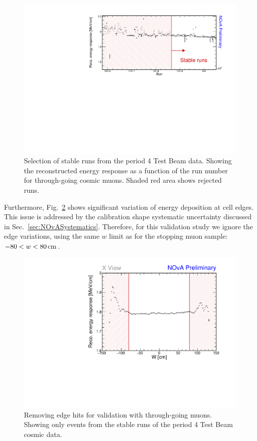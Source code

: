\begin{figure}[!ht]
  \centering
  \includegraphics[width=0.8\linewidth]{Plots/PCListAna/Period4StableRuns.pdf}
  \caption[Selection of stable runs from the period 4 Test Beam data]{Selection of stable runs from the period 4 Test Beam data. Showing the reconstructed energy response as a function of the run number for through-going cosmic muons. Shaded red area shows rejected runs.}
  \label{fig:ValidStableRuns}
\end{figure}

Furthermore, Fig.~\ref{fig:ValidLimW} shows significant variation of energy deposition at cell edges. This issue is addressed by the calibration shape systematic uncertainty discussed in Sec.~\ref{sec:NOvASystematics}. Therefore, for this validation study we ignore the edge variations, using the same $w$ limit as for the stopping muon sample:  $-80<w<\unit[80]{cm}$.

\begin{figure}[!ht]
  \centering
  \includegraphics[width=0.6\linewidth]{Plots/PCListAna/AbsCalCuts_TBData_p4_StableRuns.pdf}
  \caption[Removing edge hits for validation with through-going muons]{Removing edge hits for validation with through-going muons. Showing only events from the stable runs of the period 4 Test Beam cosmic data.}
  \label{fig:ValidLimW}
\end{figure}

